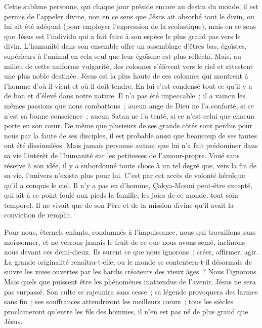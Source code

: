 \documentclass[french,twoside]{book} %
\newcommand\chapterclose{} %
\begin{document}
Cette sublime personne, qui chaque jour préside encore au destin du monde, il est permis de l’appeler divine, non en ce sens que Jésus ait absorbé tout le divin, ou lui ait été adéquat (pour employer l’expression de la scolastique), mais en ce sens que Jésus est l’individu qui a fait faire à son espèce le plus grand pas vers le divin. L’humanité dans son ensemble offre un assemblage d’êtres bas, égoïstes, supérieurs à l’animal en cela seul que leur égoïsme est plus réfléchi. Mais, au milieu de cette uniforme vulgarité, des colonnes s’élèvent vers le ciel et attestent une plus noble destinée. Jésus est la plus haute de ces colonnes qui montrent à l’homme d’où il vient et où il doit tendre. En lui s’est condensé tout ce qu’il y a de bon et d’élevé dans notre nature. Il n’a pas été impeccable ; il a vaincu les mêmes passions que nous combattons ; aucun ange de Dieu ne l’a conforté, si ce n’est sa bonne conscience ; aucun Satan ne l’a tenté, si ce n’est celui que chacun porte en son cœur. De même que plusieurs de ses grands côtés sont perdus pour nous par la faute de ses disciples, il est probable aussi que beaucoup de ses fautes ont été dissimulées. Mais jamais personne autant que lui n’a fait prédominer dans sa vie l’intérêt de l’humanité sur les petitesses de l’amour-propre. Voué sans réserve à son idée, il y a subordonné toute chose à un tel degré que, vers la fin de sa vie, l’univers n’exista plus pour lui. C’est par cet accès de volonté héroïque qu’il a conquis le ciel. Il n’y a pas eu d’homme, Çakya-Mouni peut-être excepté, qui ait à ce point foulé aux pieds la famille, les joies de ce monde, tout soin temporel. Il ne vivait que de son Père et de la mission divine qu’il avait la conviction de remplir.\par
Pour nous, éternels enfants, condamnés à l’impuissance, nous qui travaillons sans moissonner, et ne verrons jamais le fruit de ce que nous avons semé, inclinons-nous devant ces demi-dieux. Ils surent ce que nous ignorons : créer, affirmer, agir. La grande originalité renaîtra-t-elle, ou le monde se contentera-t-il désormais de suivre les voies ouvertes par les hardis créateurs des vieux âges ? Nous l’ignorons. Mais quels que puissent être les phénomènes inattendus de l’avenir, Jésus ne sera pas surpassé. Son culte se rajeunira sans cesse ; sa légende provoquera des larmes sans fin ; ses souffrances attendriront les meilleurs cœurs ; tous les siècles proclameront qu’entre les fils des hommes, il n’en est pas né de plus grand que Jésus.
\chapterclose

 
\end{document}
